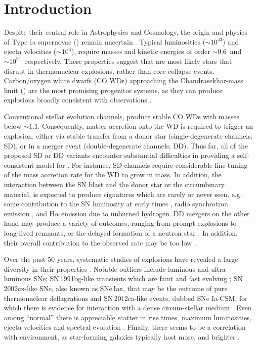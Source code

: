 \documentclass[twocolumn]{aa}
\begin{document}
\section{Introduction} \label{sec:intro}

 Despite their central role in Astrophysics and Cosmology, 
 the origin and physics of Type Ia supernovae (\ias)
remain uncertain  \citep[][]{Maoz:2013hna}. 
Typical \ia  luminosities ($\sim 10^{43}$\ergs) and ejecta velocities  
($ \sim 10^{4}$\kms), require   
masses and kinetic energies of order 
$\sim 0.6$\msun\ and $\sim 10^{51}$\erg\ respectively. 
 These properties suggest that \ias are most likely 
 stars that disrupt in  thermonuclear explosions, 
 rather than core-collapse events. 
 Carbon/oxygen white dwarfs (CO WDs) 
 approaching the Chandrasekhar-mass limit (\mch)
 are the most promising progenitor systems, as they can
 produce explosions broadly consistent with observations
 \citep{Nomoto:1982zz,Churazov:2014bga}. %
 
Conventional stellar evolution channels, produce stable CO WDs with masses below $\sim 1.1$\msun. 
Consequently, matter accretion onto the WD is required to trigger an 
explosion, either via stable  transfer from a 
donor star (single-degenerate channels; SD), or in a 
merger event (double-degenerate channels; DD).  
Thus far, all of the proposed SD or DD variants    
encounter substantial difficulties in providing 
a self-consistent model for \ias \citep{Livio:2018rue}. 
For instance, SD channels require considerable fine-tuning
of the mass accretion rate for
the WD to grow in mass. In addition, the interaction between  
the SN blast and the donor star or the circumbinary material, is expected to produce  signatures which 
are rarely or never seen, e.g. some contribution to the SN  luminosity 
at early times \citep{Kasen:2009si}, radio synchrotron emission 
\citep{Harris:2016hfr}, and H$\alpha$ emission due to unburned hydrogen. 
DD mergers on the other hand may produce a variety of outcomes, 
ranging from prompt 
explosions to long-lived remnants, or the delayed formation of a neutron star \citep{Livio:2018rue}. 
In addition, their overall contribution to the observed \ia rate may be too low \citep{vanKerkwijk:2010he,claeys2014a,Sato:2015spa}. %

Over the past 50 years, systematic studies of \ia explosions have revealed a large
diversity in their properties \citep{Taubenberger:2017hoo}. 
Notable outliers include luminous 
\citep[e.g. SN\,1991T;][]{filippenko1992} and ultra-luminous  
\citep[e.g. SNLS-03D3bb;][]{Howell:2006vn} SNe; SN\,1991bg-like transients which
are faint and fast evolving  \citep{ruiz-lapuente1993}; SN 2002cx-like SNe, 
also known as SNe\,Iax, that may be the outcome of pure thermonuclear deflagrations \citep{Jha:2017gwq}
and SN\,2012ca-like events, dubbed SNe Ia-CSM, for which 
there is evidence for interaction with a dense circum-stellar 
medium \citep{Bochenek:2017vok}. 
Even among ``normal'' \ias there is appreciable
scatter in rise times, maximum luminosities, ejecta velocities and spectral evolution   
\citep[][]{Livio:2018rue}. 
Finally, there seems to be a correlation with environment, 
as star-forming  galaxies typically  host more,  and brighter \ias \citep{Maoz:2013hna}. 
\end{document}

